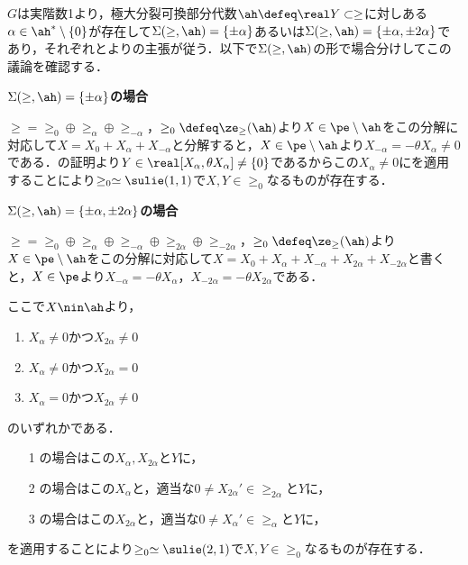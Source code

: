 \begin{npfwn}
  $G$は実階数1より，極大分裂可換部分代数$\ah\defeq \real Y\subset \ge$に対しある$\alpha\in \ah^{*}\setminus\{0\} $が存在して$\Sigma(\ge,\ah) = \{\pm\alpha\} $あるいは$\Sigma(\ge,\ah)  = \{\pm\alpha, \pm 2\alpha \} $であり，それぞれとよりの主張が従う．以下で$\Sigma(\ge,\ah)$の形で場合分けしてこの議論を確認する．
  \begin{case}
    \textbf{$\Sigma(\ge,\ah) = \{\pm\alpha\} $の場合}

    $\ge = \ge_{0} \oplus \ge_{\alpha}\oplus \ge_{-\alpha} $，$\ge_0 \defeq \ze_{\ge}(\ah) $より$X\in  \pe\setminus \ah$をこの分解に対応して$X = X_0 + X_{\alpha} + X_{-\alpha} $と分解すると，$X\in \pe\setminus \ah$より$ X_{-\alpha} = -\theta X_{\alpha}\neq 0 $である．の証明より$Y\in \real [X_{\alpha}, \theta X_{\alpha}] \neq \{0\}$であるからこの$X_{\alpha}\neq 0 $にを適用することにより$\ge_0\simeq \sulie(1,1)$で$X,Y\in \ge_0 $なるものが存在する．
    
  \end{case}
  
  \begin{case}
    \textbf{$\Sigma(\ge,\ah) = \{\pm\alpha, \pm 2\alpha\} $の場合}

    $\ge = \ge_{0} \oplus \ge_{\alpha}\oplus \ge_{-\alpha} \oplus \ge_{2\alpha}\oplus \ge_{-2\alpha}  $，$\ge_0 \defeq \ze_{\ge}(\ah) $より$X\in \pe\setminus \ah$をこの分解に対応して$X = X_0 + X_{\alpha} + X_{-\alpha} + X_{2\alpha} + X_{-2\alpha} $と書くと，$X\in \pe$より$ X_{-\alpha} = - \theta X_{\alpha} $，$ X_{-2\alpha} = - \theta X_{2\alpha} $である．

    ここで$X\nin \ah$より，
    \begin{enumerate}
    \item $X_{\alpha}\neq 0 $かつ$X_{2\alpha}\neq 0 $
    \item $X_{\alpha}\neq 0 $かつ$X_{2\alpha} =  0 $
    \item $X_{\alpha} =  0 $かつ$X_{2\alpha} \neq  0 $
    \end{enumerate}
    のいずれかである．
    \begin{enumerate}
    \item[1] の場合はこの$X_{\alpha}, X_{2\alpha} $と$Y$に，
    \item[2] の場合はこの$X_{\alpha}$と，適当な$0\neq X_{2\alpha}'\in \ge_{2\alpha} $と$Y$に，
    \item[3] の場合はこの$X_{2\alpha}$と，適当な$0\neq X_{\alpha}'\in \ge_{\alpha} $と$Y$に，
    \end{enumerate}
    を適用することにより$\ge_0\simeq \sulie(2,1)$で$X,Y\in \ge_0 $なるものが存在する．    
  \end{case}   
\end{npfwn}

